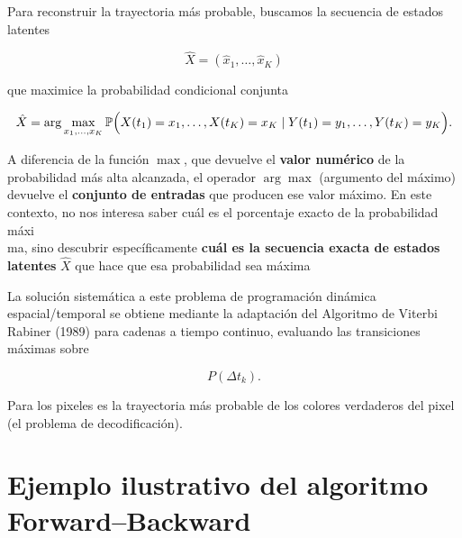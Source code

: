 \documentclass[
  spanish,
  us-letterpaper,
  DIV=11,
  numbers=noendperiod]{scrreprt}
\newcounter{quartocalloutnteno}
\newcommand{\quartocalloutnte}[1]{\refstepcounter{quartocalloutnteno}\label{#1}}
\begin{document}
\begin{tcolorbox}[enhanced jigsaw, coltitle=black, arc=.35mm, toptitle=1mm, bottomrule=.15mm, rightrule=.15mm, toprule=.15mm, colframe=quarto-callout-note-color-frame, colback=white, bottomtitle=1mm, title=\textcolor{quarto-callout-note-color}{\faInfo}\hspace{0.5em}{Nota \ref*{nte-decodificacion-optima}: Definición (Decodificación Óptima Global)}, titlerule=0mm, leftrule=.75mm, left=2mm, opacitybacktitle=0.6, opacityback=0, colbacktitle=quarto-callout-note-color!10!white, breakable]

\quartocalloutnte{nte-decodificacion-optima} 

Para reconstruir la trayectoria más probable, buscamos la secuencia de
estados latentes

\[
\hat{X}
=
(\hat{x}_1,\dots,\hat{x}_K)
\]

que maximice la probabilidad condicional conjunta

\[
\hat{X}
=
\arg\max_{x_1,\dots,x_K}
\mathbb{P}
\Bigl(
X(t_1)=x_1,\dots,X(t_K)=x_K
\mid
Y(t_1)=y_1,\dots,Y(t_K)=y_K
\Bigr).
\]

A diferencia de la función \(\max\), que devuelve el \textbf{valor
numérico} de la probabilidad más alta alcanzada, el operador
\(\arg\max\) (argumento del máximo) devuelve el \textbf{conjunto de
entradas} que producen ese valor máximo. En este contexto, no nos
interesa saber cuál es el porcentaje exacto de la probabilidad máxi\\
ma, sino descubrir específicamente \textbf{cuál es la secuencia exacta
de estados latentes} \(\hat{X}\) que hace que esa probabilidad sea
máxima

La solución sistemática a este problema de programación dinámica
espacial/temporal se obtiene mediante la adaptación del Algoritmo de
Viterbi Rabiner (1989) para cadenas a tiempo continuo, evaluando las
transiciones máximas sobre

\[
P(\Delta t_k).
\]

\end{tcolorbox}

Para los pixeles es la trayectoria más probable de los colores
verdaderos del pixel (el problema de decodificación).

\section{Ejemplo ilustrativo del algoritmo
Forward--Backward}\label{ejemplo-ilustrativo-del-algoritmo-forwardbackward}
\end{document}
